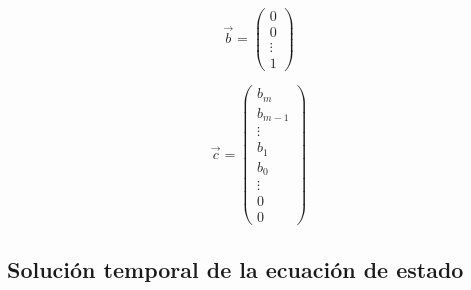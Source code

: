 \begin{equation}
\vec{b} =
\begin{pmatrix}
0 \\
0 \\
\vdots \\
1
\end{pmatrix}
\end{equation}

\begin{equation}
\vec{c} =
\begin{pmatrix}
b_m     \\
b_{m-1} \\
\vdots  \\
b_1     \\
b_0     \\
\vdots  \\
0       \\
0
\end{pmatrix}
\end{equation}

\subsection{Solución temporal de la ecuación de estado}

